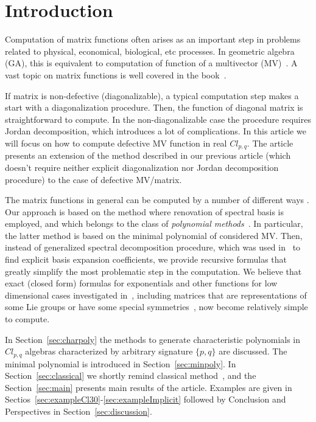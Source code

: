 \documentclass[AMA,STIX1COL]{WileyNJD-v2}
\newcommand{\cl}[2]{\ensuremath{\mathit{Cl}_{#1,#2}}}
\begin{document}


\section{Introduction}

Computation of matrix functions often arises as an important step in problems related to
physical, economical, biological, etc processes. In geometric algebra (GA), this is equivalent to computation of function of a
multivector (MV)~\cite{Gurlebeck1997,Lounesto1997,Marchuk2020}. A vast topic on matrix functions is well covered in the 
book~\cite{Higham2008}.

If matrix is non-defective (diagonalizable), a typical computation step makes a start with a diagonalization procedure. Then, the
function of diagonal matrix is straightforward to compute. In the non-diagonalizable case the procedure requires Jordan decomposition, which
introduces a lot of complications. In this article we will focus on how to compute defective MV function in real $\cl{p}{q}$. The article presents an extension of the method described in our previous article \cite{AcusDargys2024} (which doesn't require neither explicit diagonalization nor Jordan decomposition procedure) to the case of defective MV/matrix. 

The matrix functions in general can be computed by a number of different ways
\cite{Sobczyk1997,Costa2004OnTE,Zhou2005,Fujii2007ExponentiationOC,Fujii2012,Herzig2014,Zela2014}. Our approach is based on the method
where renovation of spectral basis is employed, and which belongs to the class of {\it polynomial methods}~\cite{Sobczyk1997}.
In particular, the latter method is based on the minimal polynomial of considered MV. Then, instead of generalized spectral
decomposition procedure, which was used in~\cite{Sobczyk1997} to find explicit basis expansion coefficients, we provide recursive
formulas that greatly simplify the most problematic step in the computation. We believe that exact (closed form) formulas for exponentials and
other functions for low dimensional cases investigated in~\cite{Zela2014,Fujii2012,Fujii2007ExponentiationOC}, including matrices that are
representations of some Lie groups or have some special symmetries~\cite{Zhou2005,Costa2004OnTE}, now become relatively simple to
compute.

In Section~\ref{sec:charpoly} the methods to generate characteristic polynomials in \cl{p}{q} algebras characterized by
arbitrary signature $\{p,q\}$ are discussed. The minimal polynomial is introduced in Section~\ref{sec:minpoly}. In Section~\ref{sec:classical} we shortly remind classical method~\cite{Sobczyk1997},
and the Section~\ref{sec:main} presents main results of the article. Examples are given in Sectios~\ref{sec:exampleCl30}-\ref{sec:exampleImplicit} followed by Conclusion and Perspectives in Section~\ref{sec:discussion}.
\end{document}
